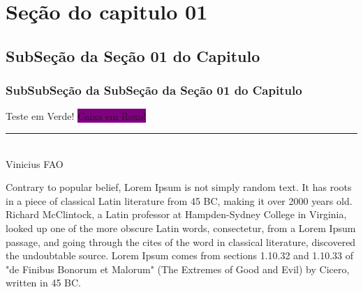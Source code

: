 \documentclass[12pt, a4paper, onside]{article}
\begin{document}
\section{Seção do capitulo 01}
\subsection{SubSeção da Seção 01 do Capitulo}
\subsubsection{SubSubSeção da SubSeção da Seção 01 do Capitulo}


\textcolor{Verde primavera}{Teste em Verde!}
{\color{Aqua}{Trecho em Azul!}}
\colorbox{Purple}{Caixa em Roxo!}

\newpage
\begin{center}
    \noindent
    \rule{10cm}{0.02cm}\\
    Vinicius FAO
\end{center}

\newpage
Contrary to popular belief,
Lorem Ipsum is not simply random text.
It has roots in a piece of classical Latin literature from 45 BC,
making it over 2000 years old. Richard McClintock, a Latin professor
at Hampden-Sydney College in Virginia, looked up one of the more obscure
Latin words, consectetur, from a Lorem Ipsum passage, and going through the cites of the word in classical literature,
discovered the undoubtable source. Lorem Ipsum comes from sections 1.10.32 and 1.10.33 of "de Finibus Bonorum et Malorum"
(The Extremes of Good and Evil) by Cicero, written in 45 BC.\\
\end{document}
